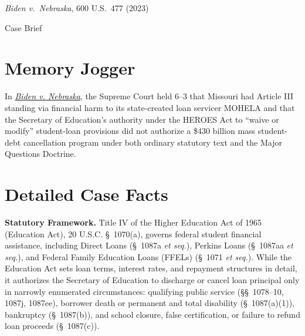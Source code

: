 \documentclass[12pt]{article}
\begin{document}
\begin{center}
{\LARGE \textit{Biden v.\ Nebraska}, 600 U.S.\ 477 (2023)\par}
\vspace{0.8em}
{\large Case Brief\par}
\end{center}
\vspace{1em}

\section{Memory Jogger}

In \href{https://www.law.cornell.edu/supremecourt/text/22-506}{\textit{Biden v. Nebraska}}, the Supreme Court held 6--3 that Missouri had Article III standing via financial harm to its state-created loan servicer MOHELA and that the Secretary of Education's authority under the HEROES Act to ``waive or modify'' student-loan provisions did not authorize a \$430 billion mass student-debt cancellation program under both ordinary statutory text and the Major Questions Doctrine.

\section{Detailed Case Facts}

\textbf{Statutory Framework.} Title IV of the Higher Education Act of 1965 (Education Act), 20 U.S.C. \S~1070(a), governs federal student financial assistance, including Direct Loans (\S~1087a \textit{et seq.}), Perkins Loans (\S~1087aa \textit{et seq.}), and Federal Family Education Loans (FFELs) (\S~1071 \textit{et seq.}). While the Education Act sets loan terms, interest rates, and repayment structures in detail, it authorizes the Secretary of Education to discharge or cancel loan principal only in narrowly enumerated circumstances: qualifying public service (\S\S~1078--10, 1087j, 1087ee), borrower death or permanent and total disability (\S~1087(a)(1)), bankruptcy (\S~1087(b)), and school closure, false certification, or failure to refund loan proceeds (\S~1087(c)).
\end{document}
